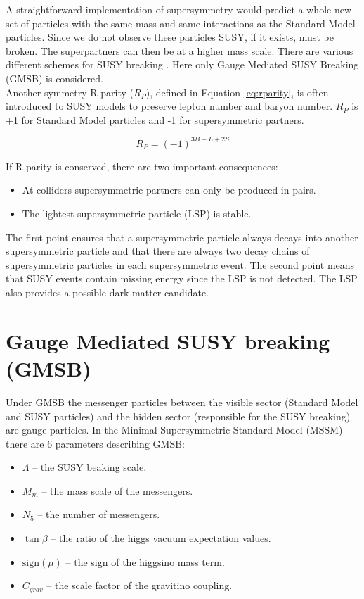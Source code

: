 A straightforward implementation of supersymmetry would predict a whole new set
of particles with the same mass and same interactions as the Standard Model
particles. Since we do not observe these particles SUSY, if it exists, must be 
broken. The superpartners can then be at a higher mass scale. There are various
different schemes for SUSY breaking \cite{atchinson}. Here only Gauge Mediated 
SUSY Breaking (GMSB) is considered. \\

Another symmetry R-parity ($R_{P}$), defined in Equation \ref{eq:rparity}, is 
often introduced to SUSY models to preserve lepton number and baryon number. 
$R_{P}$ is +1 for Standard Model particles and -1 for supersymmetric partners.

\begin{equation}
R_{P} = (-1)^{3B+L+2S}
\label{eq:rparity}
\end{equation}

If R-parity is conserved, there are two important consequences:

\begin{itemize}
\item At colliders supersymmetric partners can only be produced in pairs.
\item The lightest supersymmetric particle (LSP) is stable.
\end{itemize}

The first point ensures that a supersymmetric particle always decays into 
another supersymmetric particle and that there are always two decay chains of 
supersymmetric particles in each supersymmetric event. The second point means 
that SUSY events contain missing energy since the LSP is not detected. The LSP 
also provides a possible dark matter candidate.

\section{Gauge Mediated SUSY breaking (GMSB)}

Under GMSB the messenger particles between the visible sector (Standard Model
and SUSY particles) and the hidden sector (responsible for the SUSY breaking)
are gauge particles. In the Minimal Supersymmetric Standard Model (MSSM) there 
are 6 parameters describing GMSB:

\begin{itemize}
\item $\Lambda$ -- the SUSY beaking scale. 
\item $M_{m}$ -- the mass scale of the messengers.
\item $N_{5}$ -- the number of messengers.
\item $\tan\beta$ -- the ratio of the higgs vacuum expectation values.
\item $\mbox{sign}(\mu)$ -- the sign of the higgsino mass term.
\item $C_{grav}$ -- the scale factor of the gravitino coupling.
\end{itemize}

